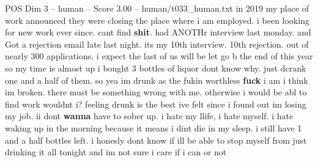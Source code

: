 \begin{textsample}{POS Dim 3 – human – Score 3.00 – human/t033\_human.txt}  \label{ex:f3_pos_008}
in 2019 my place of work announced they were closing the place where i am employed. i been looking for new work ever since. cant find \textbf{shit}. had ANOTHr interview last monday. and Got a rejection email late last night. its my 10th interview. 10th rejection. out of nearly 300 applications. i expect the last of us will be let go b the end of this year so my time is almost up i bought 3 bottles of liquor dont know why. just dcrank one and a half of them. so yea im drunk as the fukin worthless \textbf{fuck} i am i think im broken. there must be something wrong with me. otherwise i would be abl to find work wouldnt i? feeling drunk is the best ive felt since i found out im losing my job. ii dont \textbf{wanna} have to sober up. i hate my llife, i hate myself. i hate waking up in the morning because it means i dint die in my sleep. i still have 1 and a half bottles left. i honesly dont know if ill be able to stop myself from just drinking it all tonight and im not sure i care if i can or not

\end{textsample}
